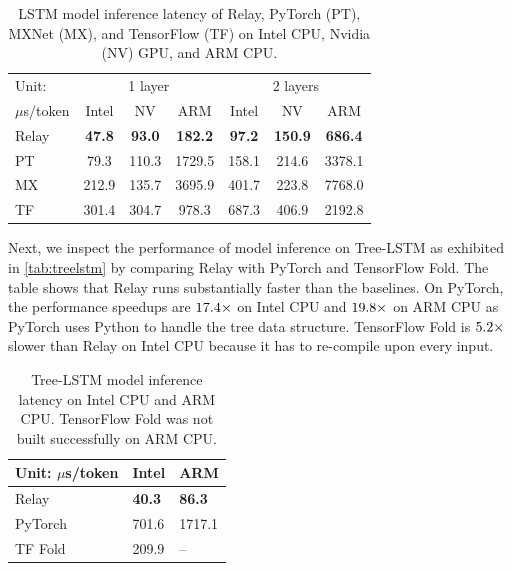 \begin{table}[t]
\centering
\small
\begin{tabular}{p{0.9cm}|ccc|ccc}
\toprule
Unit: & \multicolumn{3}{c|}{1 layer} & \multicolumn{3}{c}{2 layers} \\
$\mu$s/token & Intel & NV & ARM & Intel & NV & ARM \\ \midrule
Relay & \bf{47.8} & \bf{93.0} & \bf{182.2} & \bf{97.2} & \bf{150.9} & \bf{686.4} \\
PT & 79.3 & 110.3 & 1729.5 & 158.1 & 214.6 & 3378.1 \\
MX  & 212.9 & 135.7 & 3695.9 & 401.7 & 223.8 & 7768.0 \\
TF & 301.4 & 304.7 & 978.3 & 687.3 & 406.9 & 2192.8 \\
\bottomrule
\end{tabular}
\caption{LSTM model inference latency of Relay, PyTorch (PT), MXNet (MX), and TensorFlow (TF) on Intel CPU, Nvidia (NV) GPU, and ARM CPU.}
\label{tab:lstm}
\end{table}

Next, we inspect the performance of model inference on Tree-LSTM as exhibited in \autoref{tab:treelstm} by comparing Relay with PyTorch and TensorFlow Fold. The table shows that Relay runs substantially faster than the baselines. On PyTorch, the performance speedups are $\fpeval{round(701.1/40.3, 1)}\times$ on Intel CPU and $\fpeval{round(1711.1/86.3, 1)}\times$ on ARM CPU as PyTorch uses Python to handle the tree data structure. TensorFlow Fold is $\fpeval{round(209.9/40.3, 1)}\times$ slower than Relay on Intel CPU because it has to re-compile upon every input.

\begin{table}[t]
\centering
\begin{tabular}{l|ll}
\toprule
Unit: $\mu$s/token        & Intel     & ARM \\ \midrule
Relay  & \bf{40.3}  & \bf{86.3}  \\
PyTorch & 701.6 & 1717.1  \\
TF Fold & 209.9 & --  \\
\bottomrule
\end{tabular}
\caption{Tree-LSTM model inference latency on Intel CPU and ARM CPU. TensorFlow Fold was not built successfully on ARM CPU.}
\label{tab:treelstm}
\end{table}

